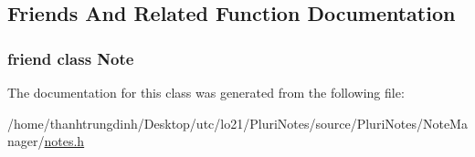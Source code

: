 \subsection{Friends And Related Function Documentation}
\subsubsection[{\texorpdfstring{Note}{Note}}]{\setlength{\rightskip}{0pt plus 5cm}friend class {\bf Note}\hspace{0.3cm}{\ttfamily [friend]}}\hypertarget{classNote_1_1Iterator_a93d7e72623acdfa5b079a11fbf2d9f9d}{}\label{classNote_1_1Iterator_a93d7e72623acdfa5b079a11fbf2d9f9d}


The documentation for this class was generated from the following file\+:\begin{DoxyCompactItemize}
\item 
/home/thanhtrungdinh/\+Desktop/utc/lo21/\+Pluri\+Notes/source/\+Pluri\+Notes/\+Note\+Manager/\hyperlink{notes_8h}{notes.\+h}\end{DoxyCompactItemize}
